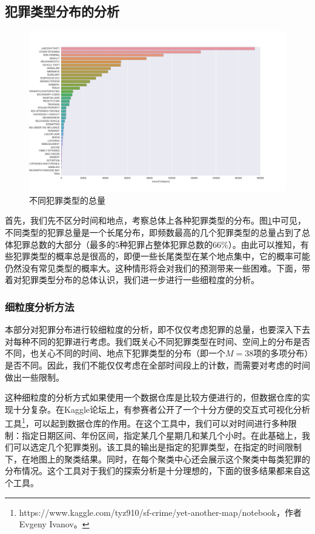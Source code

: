 \subsection{犯罪类型分布的分析}

\begin{figure}[tb]
    \centering
    \includegraphics[width=1.0\linewidth]{fig/category}
    \caption{不同犯罪类型的总量}
    \label{fig:tot_category}
\end{figure}

首先，我们先不区分时间和地点，考察总体上各种犯罪类型的分布。图\ref{fig:tot_category}中可见，不同类型的犯罪总量是一个长尾分布，即频数最高的几个犯罪类型的总量占到了总体犯罪总数的大部分（最多的5种犯罪占整体犯罪总数的66\%）。由此可以推知，有些犯罪类型的概率总是很高的，即便一些长尾类型在某个地点集中，它的概率可能仍然没有常见类型的概率大。这种情形将会对我们的预测带来一些困难。下面，带着对犯罪类型分布的总体认识，我们进一步进行一些细粒度的分析。

\subsubsection{细粒度分析方法}

本部分对犯罪分布进行较细粒度的分析，即不仅仅考虑犯罪的总量，也要深入下去对每种不同的犯罪进行考虑。我们既关心不同犯罪类型在时间、空间上的分布是否不同，也关心不同的时间、地点下犯罪类型的分布（即一个$M=38$项的多项分布）是否不同。因此，我们不能仅仅考虑在全部时间段上的计数，而需要对考虑的时间做出一些限制。

这种细粒度的分析方式如果使用一个数据仓库是比较方便进行的，但数据仓库的实现十分复杂。在Kaggle论坛上，有参赛者公开了一个十分方便的交互式可视化分析工具\footnote{https://www.kaggle.com/tyz910/sf-crime/yet-another-map/notebook，作者Evgeny Ivanov。}，可以起到数据仓库的作用。在这个工具中，我们可以对时间进行多种限制：指定日期区间、年份区间，指定某几个星期几和某几个小时。在此基础上，我们可以选定几个犯罪类别。该工具的输出是指定的犯罪类型，在指定的时间限制下，在地图上的聚类结果。同时，在每个聚类中心还会展示这个聚类中每类犯罪的分布情况。这个工具对于我们的探索分析是十分理想的，下面的很多结果都来自这个工具。

